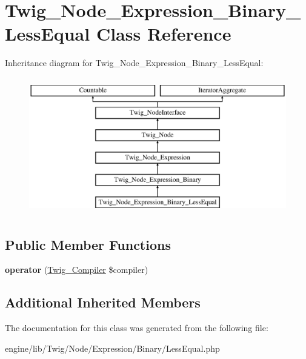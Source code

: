 \hypertarget{class_twig___node___expression___binary___less_equal}{}\section{Twig\+\_\+\+Node\+\_\+\+Expression\+\_\+\+Binary\+\_\+\+Less\+Equal Class Reference}
\label{class_twig___node___expression___binary___less_equal}
Inheritance diagram for Twig\+\_\+\+Node\+\_\+\+Expression\+\_\+\+Binary\+\_\+\+Less\+Equal\+:\begin{figure}[H]
\begin{center}
\leavevmode
\includegraphics[height=6.000000cm]{class_twig___node___expression___binary___less_equal}
\end{center}
\end{figure}
\subsection*{Public Member Functions}
\begin{DoxyCompactItemize}
\item 
\hypertarget{class_twig___node___expression___binary___less_equal_af77318ec88d5f8a508684970a150b670}{}{\bfseries operator} (\hyperlink{class_twig___compiler}{Twig\+\_\+\+Compiler} \$compiler)\label{class_twig___node___expression___binary___less_equal_af77318ec88d5f8a508684970a150b670}

\end{DoxyCompactItemize}
\subsection*{Additional Inherited Members}


The documentation for this class was generated from the following file\+:\begin{DoxyCompactItemize}
\item 
engine/lib/\+Twig/\+Node/\+Expression/\+Binary/Less\+Equal.\+php\end{DoxyCompactItemize}
